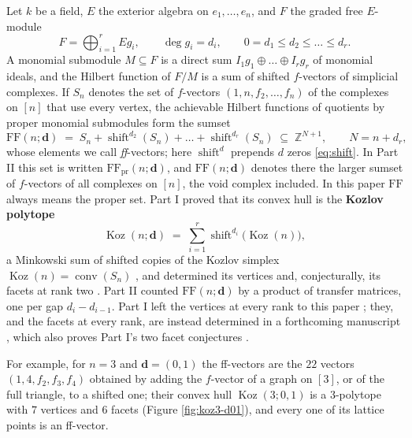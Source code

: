 \documentclass[11pt, a4paper, abstract=yes]{scrartcl}
\theoremstyle{definition}
\theoremstyle{remark}
\theoremstyle{plain}
\newcommand{\vek}[1]{\boldsymbol{#1}}
\theoremstyle{remark}
\theoremstyle{plain}
\newcommand{\Koz}{\operatorname{Koz}}
\newcommand{\shift}{\operatorname{shift}}
\newcommand{\conv}{\operatorname{conv}}
\newcommand{\FF}{\mathrm{FF}}
\let\autocite\cite
\begin{document}
Let \(k\) be a field, \(E\) the exterior algebra on \(e_1,\dots,e_n\), and \(F\) the graded free
\(E\)-module
\begin{equation}\label{eq:F}
  F=\bigoplus_{i=1}^rEg_i,\qquad \deg g_i=d_i,\qquad 0=d_1\le d_2\le\dots\le d_r .
\end{equation}
A monomial
submodule \(M\subseteq F\) is a direct sum \(I_1g_1\oplus\dots\oplus I_rg_r\) of monomial ideals,
and the Hilbert function of \(F/M\) is a sum of shifted \(f\)-vectors of simplicial complexes. If
\(S_n\) denotes the set of \(f\)-vectors \((1,n,f_2,\dots,f_n)\) of the complexes on \([n]\) that
use every vertex, the achievable Hilbert functions of quotients by proper monomial submodules form
the sumset
\begin{equation}\label{eq:ff}
  \FF(n;\vek d)\;=\;S_n+\shift^{d_2}(S_n)+\dots+\shift^{d_r}(S_n)\;\subseteq\;\mathbb Z^{N+1},
  \qquad N=n+d_r ,
\end{equation}
whose elements we call \emph{ff}-vectors; here \(\shift^d\) prepends \(d\) zeros \eqref{eq:shift}. In Part II this set is written \(\FF_{\mathrm{pr}}(n;\vek d)\),
and \(\FF(n;\vek d)\) denotes there the larger sumset of \(f\)-vectors of all complexes on \([n]\),
the void complex included. In this paper \(\FF\) always means the proper set. Part I
\autocite{SnellmanArticle1} proved that its convex hull is the \textbf{Kozlov polytope}
\begin{equation}\label{eq:koz}
  \Koz(n;\vek d)\;=\;\sum_{i=1}^r\shift^{d_i}\bigl(\Koz(n)\bigr),
\end{equation}
a Minkowski sum of shifted copies of the Kozlov simplex \(\Koz(n)=\conv(S_n)\)
\autocite[Theorem 39]{SnellmanArticle1}, and determined its vertices and, conjecturally, its facets
at rank two \autocite[Section 9]{SnellmanArticle1}. Part II \autocite{SnellmanArticle2} counted
\(\FF(n;\vek d)\) by a product of transfer matrices, one per gap \(d_i-d_{i-1}\). Part I left the
vertices at every rank to this paper \autocite[Section 9.3]{SnellmanArticle1}; they, and the facets at
every rank, are instead determined in a forthcoming manuscript \autocite{SnellmanArticle4}, which also
proves Part I's two facet conjectures \autocite[Conjectures 52 and 55]{SnellmanArticle1}.

For example, for \(n=3\) and \(\vek d=(0,1)\) the ff-vectors are the \(22\) vectors
\((1,4,f_2,f_3,f_4)\) obtained by adding the \(f\)-vector of a graph on \([3]\), or of the full
triangle, to a shifted one; their convex hull \(\Koz(3;0,1)\) is a \(3\)-polytope with \(7\) vertices and
\(6\) facets (Figure \ref{fig:koz3-d01}), and every one of its lattice points is an ff-vector.
\end{document}
